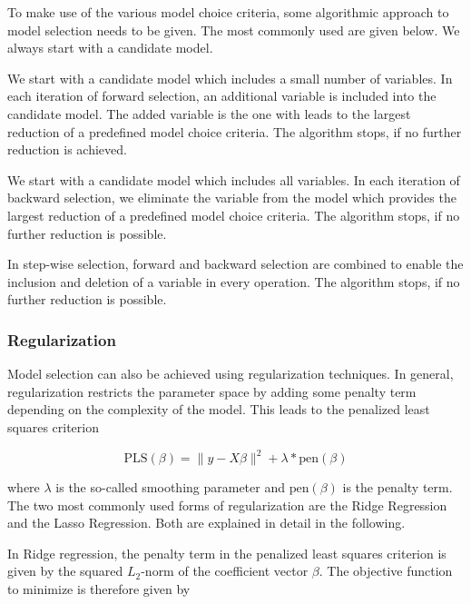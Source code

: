 To make use of the various model choice criteria, some algorithmic approach to model selection needs to be given. The most commonly used are given below. We always start with a candidate model. \cite{fahrmeir2013regression}


We start with a candidate model which includes a small number of variables. In each iteration of forward selection, an additional variable is included into the candidate model.  The added variable is the one with leads to the largest reduction of a predefined model choice criteria. The algorithm stops, if no further reduction is achieved.


We start with a candidate model which includes all variables. In each iteration of backward selection, we eliminate the variable from the model which provides the largest reduction of a predefined model choice criteria. The algorithm stops, if no further reduction is possible. 


In step-wise selection, forward and backward selection are combined to enable the inclusion and deletion of a variable in every operation. The algorithm stops, if no further reduction is possible.

\subsubsection{Regularization}

Model selection can also be achieved using regularization techniques. In general, regularization restricts the parameter space by adding some penalty term depending on the complexity of the model. This leads to the penalized least squares criterion

$$\text{PLS}(\beta) = \lVert y - X\beta\rVert^2 + \lambda *\text{pen}(\beta)$$

where $\lambda$ is the so-called smoothing parameter and $\text{pen}(\beta)$ is the penalty term. The two most commonly used forms of regularization are the Ridge Regression and the Lasso Regression. Both are explained in detail in the following.


In Ridge regression, the penalty term in the penalized least squares criterion is given by the squared $L_2$-norm of the coefficient vector $\beta$. The objective function to minimize is therefore given by

